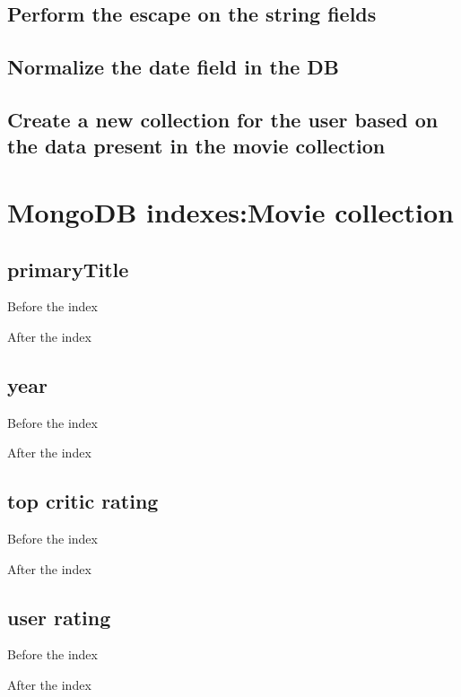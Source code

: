 \begin{alphasection}
\subsection{Perform the escape on the string fields}\label{subsec:theOne}


\subsection{Normalize the date field in the DB}\label{subsec:dateNormalization}


\subsection{Create a new collection for the user based on the data present in the movie collection}\label{subsec:userCreation}


\section{MongoDB indexes:Movie collection}\label{mongoindexes}
\subsection{primaryTitle}
Before the index

After the index

\subsection{year}
Before the index

After the index

\subsection{top critic rating}
Before the index

After the index

\subsection{user rating}
Before the index

After the index


\end{alphasection}
